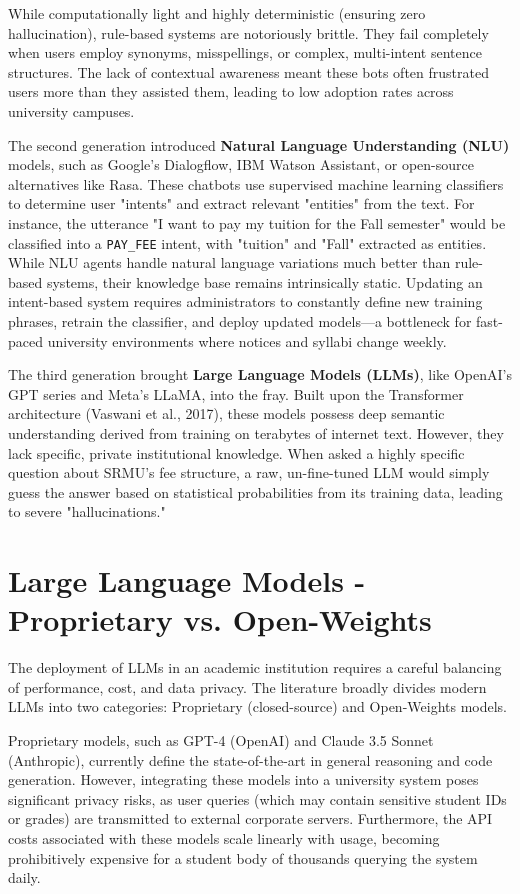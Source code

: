 \documentclass[12pt,a4paper]{report}
\begin{document}
While computationally light and highly deterministic (ensuring zero hallucination), rule-based systems are notoriously brittle. They fail completely when users employ synonyms, misspellings, or complex, multi-intent sentence structures. The lack of contextual awareness meant these bots often frustrated users more than they assisted them, leading to low adoption rates across university campuses.

The second generation introduced \textbf{Natural Language Understanding (NLU)} models, such as Google's Dialogflow, IBM Watson Assistant, or open-source alternatives like Rasa. These chatbots use supervised machine learning classifiers to determine user "intents" and extract relevant "entities" from the text. For instance, the utterance "I want to pay my tuition for the Fall semester" would be classified into a \texttt{PAY\_FEE} intent, with "tuition" and "Fall" extracted as entities. While NLU agents handle natural language variations much better than rule-based systems, their knowledge base remains intrinsically static. Updating an intent-based system requires administrators to constantly define new training phrases, retrain the classifier, and deploy updated models---a bottleneck for fast-paced university environments where notices and syllabi change weekly.

The third generation brought \textbf{Large Language Models (LLMs)}, like OpenAI's GPT series and Meta's LLaMA, into the fray. Built upon the Transformer architecture (Vaswani et al., 2017), these models possess deep semantic understanding derived from training on terabytes of internet text. However, they lack specific, private institutional knowledge. When asked a highly specific question about SRMU's fee structure, a raw, un-fine-tuned LLM would simply guess the answer based on statistical probabilities from its training data, leading to severe "hallucinations."

\section{Large Language Models - Proprietary vs. Open-Weights}
The deployment of LLMs in an academic institution requires a careful balancing of performance, cost, and data privacy. The literature broadly divides modern LLMs into two categories: Proprietary (closed-source) and Open-Weights models.

Proprietary models, such as GPT-4 (OpenAI) and Claude 3.5 Sonnet (Anthropic), currently define the state-of-the-art in general reasoning and code generation. However, integrating these models into a university system poses significant privacy risks, as user queries (which may contain sensitive student IDs or grades) are transmitted to external corporate servers. Furthermore, the API costs associated with these models scale linearly with usage, becoming prohibitively expensive for a student body of thousands querying the system daily.
\end{document}
